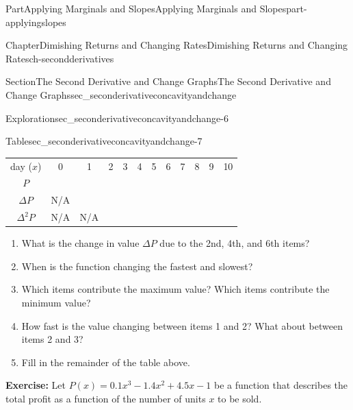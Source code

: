 \documentclass{tufte-book}
\newcommand{\tabularfont}{\relax}
\newcommand{\terminology}[1]{\textbf{#1}}
\numberwithin{equation}{chapter}
\begin{document}
\begin{partptx}{Part}{Applying Marginals and Slopes}{}{Applying Marginals and Slopes}{}{}{part-applyingslopes}
\begin{chapterptx}{Chapter}{Dimishing Returns and Changing Rates}{}{Dimishing Returns and Changing Rates}{}{}{ch-secondderivatives}
\begin{sectionptx}{Section}{The Second Derivative and Change Graphs}{}{The Second Derivative and Change Graphs}{}{}{sec_seconderivativeconcavityandchange}
\begin{exploration}{Exploration}{}{sec_seconderivativeconcavityandchange-6}
\begin{image}{0}{1}{0}{}
{\begin{tikzpicture}[xscale=\xscale,yscale=\yscale]
	
\end{tikzpicture}
}%
\end{image}%
%
\end{exploration}%
\begin{tableptx}{Table}{\textbf{}}{sec_seconderivativeconcavityandchange-7}{}%
\centering%
{\tabularfont%
\begin{tabular}{llllllllllll}
\multicolumn{1}{c}{day (\(x\))}&\multicolumn{1}{c}{0}&\multicolumn{1}{c}{1}&\multicolumn{1}{c}{2}&\multicolumn{1}{c}{3}&\multicolumn{1}{c}{4}&\multicolumn{1}{c}{5}&\multicolumn{1}{c}{6}&\multicolumn{1}{c}{7}&\multicolumn{1}{c}{8}&\multicolumn{1}{c}{9}&\multicolumn{1}{c}{10}\tabularnewline[0pt]
\multicolumn{1}{c}{\(P\)}&\multicolumn{1}{c}{}&\multicolumn{1}{c}{}&\multicolumn{1}{c}{}&\multicolumn{1}{c}{}&\multicolumn{1}{c}{}&\multicolumn{1}{c}{}&\multicolumn{1}{c}{}&\multicolumn{1}{c}{}&\multicolumn{1}{c}{}&\multicolumn{1}{c}{}&\multicolumn{1}{c}{}\tabularnewline[0pt]
\multicolumn{1}{c}{\(\Delta P\)}&\multicolumn{1}{c}{N\slash{}A}&\multicolumn{1}{c}{}&\multicolumn{1}{c}{}&\multicolumn{1}{c}{}&\multicolumn{1}{c}{}&\multicolumn{1}{c}{}&\multicolumn{1}{c}{}&\multicolumn{1}{c}{}&\multicolumn{1}{c}{}&\multicolumn{1}{c}{}&\multicolumn{1}{c}{}\tabularnewline[0pt]
\multicolumn{1}{c}{\(\Delta^2 P\)}&\multicolumn{1}{c}{N\slash{}A}&\multicolumn{1}{c}{N\slash{}A}&\multicolumn{1}{c}{}&\multicolumn{1}{c}{}&\multicolumn{1}{c}{}&\multicolumn{1}{c}{}&\multicolumn{1}{c}{}&\multicolumn{1}{c}{}&\multicolumn{1}{c}{}&\multicolumn{1}{c}{}&\multicolumn{1}{c}{}
\end{tabular}
}%
\end{tableptx}%
%
\begin{enumerate}
\item{}What is the change in value \(\Delta P\) due to the 2nd, 4th, and 6th items?%
\item{}When is the function changing the fastest and slowest?%
\item{}Which items contribute the maximum value? Which items contribute the minimum value?%
\item{}How fast is the value changing between items 1 and 2? What about between items 2 and 3?%
\item{}Fill in the remainder of the table above.%
\end{enumerate}
%
\par
\terminology{Exercise:} Let \(P(x) = 0.1x^3 -1.4x^2 + 4.5x - 1\) be a function that describes the total profit as a function of the number of units \(x\) to be sold.%
\begin{image}{0}{1}{0}{}%

\end{image}
\end{sectionptx}
\end{chapterptx}
\end{partptx}
\end{document}

